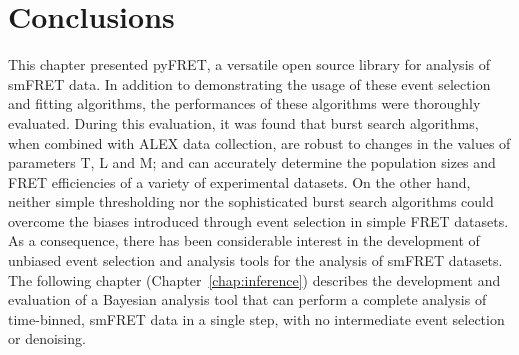 \clearpage

\section{Conclusions}
This chapter presented pyFRET, a versatile open source library for analysis of smFRET data. In addition to demonstrating the usage of these event selection and fitting algorithms, the performances of these algorithms were thoroughly evaluated. During this evaluation, it was found that burst search algorithms, when combined with ALEX data collection, are robust to changes in the values of parameters T, L and M; and can accurately determine the population sizes and FRET efficiencies of a variety of experimental datasets. On the other hand, neither simple thresholding nor the sophisticated burst search algorithms could overcome the biases introduced through event selection in simple FRET datasets. As a consequence, there has been considerable interest in the development of unbiased event selection and analysis tools for the analysis of smFRET datasets. The following chapter (Chapter~\ref{chap:inference}) describes the development and evaluation of a Bayesian analysis tool that can perform a complete analysis of time-binned, smFRET data in a single step, with no intermediate event selection or denoising.  











